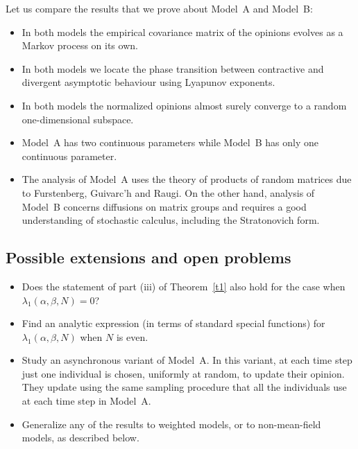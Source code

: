 \documentclass[12pt]{article}
\newcommand{\1}{\mathbf{1}}
\begin{document}
{
Let us compare the results that we prove about Model~A and Model~B:
\begin{itemize}
\item In both models the empirical covariance matrix of the opinions evolves as a Markov process on its own.
\item In both models we locate the phase transition between contractive and divergent asymptotic behaviour using Lyapunov exponents.
\item In both models the normalized opinions almost surely converge to a random one-dimensional subspace.
\item Model~A has two continuous parameters while Model~B has only one continuous parameter. 
\item 
The analysis of Model~A uses the theory of products of random matrices due to Furstenberg, Guivarc'h and Raugi. On the other hand, analysis of Model~B concerns diffusions on matrix groups and requires a good understanding of stochastic calculus, including the Stratonovich form.
\end{itemize}
}

\subsection{Possible extensions and open problems}\label{S: open problems}
\begin{itemize}
\item Does the statement of part (iii) of Theorem~\ref{t1} also hold for the case when $\lambda_1(\alpha,\beta,N)=0$?
\item  Find an analytic expression (in terms of standard special functions) for $\lambda_1(\alpha, \beta, N)$ when $N$ is even.
\item Study an asynchronous variant of Model~A. In this variant, at each time step just one individual is chosen, uniformly at random, to update their opinion. They update using the same sampling procedure that all the individuals use at each time step in Model~A. 
\item Generalize any of the results to weighted models, or to non-mean-field models, as described below. \end{itemize}
\end{document}
